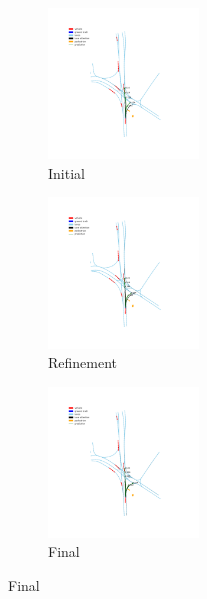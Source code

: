 \begin{figure}
    \centering
    \begin{subfigure}[t]{0.3\linewidth}
        \includegraphics[height=4cm,trim={300 160 280 330},clip]{images_results/2706cc4eb61844a1a5c7a5cb766ffc2e_37ab2d88d07846ef96d5227e9c5a15d7_minADE5_5.01_0-min.png}
        \caption{Initial}
    \end{subfigure}
    \begin{subfigure}[t]{0.3\linewidth}
        \includegraphics[height=4cm,trim={300 160 280 330},clip]{images_results/2706cc4eb61844a1a5c7a5cb766ffc2e_37ab2d88d07846ef96d5227e9c5a15d7_minADE5_5.01_1-min.png}
        \caption{Refinement}
    \end{subfigure}
    \begin{subfigure}[t]{0.3\linewidth}
        \includegraphics[height=4cm,trim={300 160 280 330},clip]{images_results/2706cc4eb61844a1a5c7a5cb766ffc2e_37ab2d88d07846ef96d5227e9c5a15d7_minADE5_5.01_2-min.png}
        \caption{Final}
    \end{subfigure}
\end{figure}
